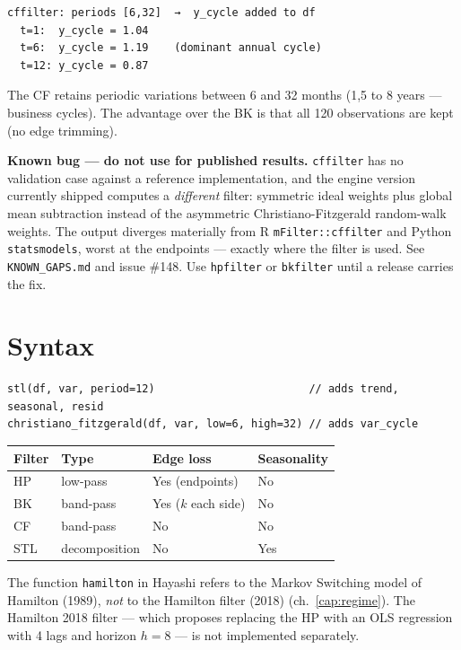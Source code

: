 \begin{lstlisting}[language={}, basicstyle=\ttfamily\small, frame=none,
  numbers=none, backgroundcolor=\color{codbg}]
cffilter: periods [6,32]  →  y_cycle added to df
  t=1:  y_cycle = 1.04
  t=6:  y_cycle = 1.19    (dominant annual cycle)
  t=12: y_cycle = 0.87
\end{lstlisting}

The CF retains periodic variations between 6 and 32 months (1{,}5 to 8 years — business
cycles). The advantage over the BK is that all 120 observations are kept
(no edge trimming).

\begin{aviso}
  \textbf{Known bug --- do not use for published results.} \texttt{cffilter}
  has no validation case against a reference implementation, and the engine
  version currently shipped computes a \emph{different} filter: symmetric ideal
  weights plus global mean subtraction instead of the asymmetric
  Christiano-Fitzgerald random-walk weights. The output diverges materially from
  R \texttt{mFilter::cffilter} and Python \texttt{statsmodels}, worst at the
  endpoints --- exactly where the filter is used. See \texttt{KNOWN\_GAPS.md} and
  issue \#148. Use \texttt{hpfilter} or \texttt{bkfilter} until a release
  carries the fix.
\end{aviso}

\section{Syntax}

\begin{lstlisting}
stl(df, var, period=12)                        // adds trend, seasonal, resid
christiano_fitzgerald(df, var, low=6, high=32) // adds var_cycle
\end{lstlisting}

\begin{center}
\begin{tabular}{llll}
\toprule
\textbf{Filter} & \textbf{Type} & \textbf{Edge loss} & \textbf{Seasonality} \\
\midrule
HP              & low-pass      & Yes (endpoints)       & No \\
BK              & band-pass     & Yes ($k$ each side)   & No \\
CF              & band-pass     & No                    & No \\
STL             & decomposition & No                    & Yes \\
\bottomrule
\end{tabular}
\end{center}

\begin{nota}
  The function \texttt{hamilton} in Hayashi refers to the Markov
  Switching model of Hamilton (1989), \emph{not} to the Hamilton filter (2018)
  (ch.~\ref{cap:regime}). The Hamilton 2018 filter — which proposes replacing
  the HP with an OLS regression with 4 lags and horizon $h = 8$ —
  is not implemented separately.
\end{nota}
